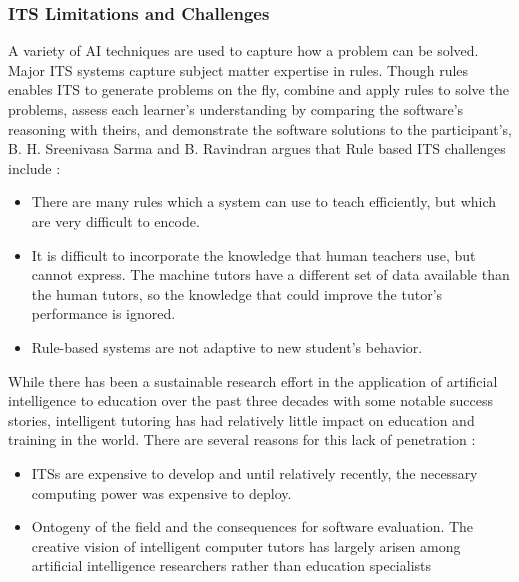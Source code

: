 \documentclass[12pt,a4paper,final,twoside,onecolumn,titlepage]{book}
\begin{document}
\subsubsection{ITS Limitations and Challenges}
A variety of AI techniques are used to capture how a problem can be solved. Major \gls{ITS} systems capture subject matter expertise in rules. Though rules enables \gls{ITS} to generate problems on the fly, combine and apply rules to solve the problems, assess each learner’s understanding by comparing the software’s reasoning with theirs, and demonstrate the software solutions to the participant’s, B. H. Sreenivasa Sarma and B. Ravindran argues that Rule based \gls{ITS} challenges include \cite{R48}:
\begin{itemize}
\item There are many rules which a system can use to teach efficiently, but which are very difficult to encode.
\item It is difficult to incorporate the knowledge that human teachers use, but cannot express. The machine tutors have a different set of data available than the human tutors, so the knowledge that could improve the tutor’s performance is ignored.
\item Rule-based systems are not adaptive to new student’s behavior.
\end{itemize}
While there has been a sustainable research effort in the application of artificial intelligence to education over the past three decades with some notable success stories, intelligent tutoring has had relatively little impact on education and training in the world. There are several reasons for this lack of penetration \cite{R47}:
\begin{itemize}
\item ITSs are expensive to develop and until relatively recently, the necessary computing power was expensive to deploy.
\item Ontogeny of the field and the consequences for software evaluation. The creative vision of intelligent computer tutors has largely arisen among artificial intelligence researchers rather than education specialists
\end{itemize}
\end{document}
